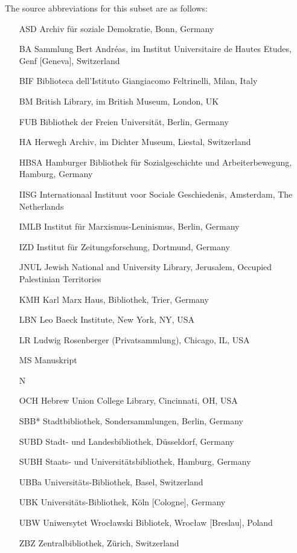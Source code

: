 The source abbreviations for this subset are as follows:
\begin{itemize}
    \item[ASD] Archiv für soziale Demokratie, Bonn, Germany
    \item[BA] Sammlung Bert Andréas, im Institut Universitaire de Hautes Etudes, Genf [Geneva], Switzerland
    \item[BIF] Biblioteca dell'Istituto Giangiacomo Feltrinelli, Milan, Italy
    \item[BM] British Library, im British Museum, London, UK
    \item[FUB] Bibliothek der Freien Universität, Berlin, Germany
    \item[HA] Herwegh Archiv, im Dichter Museum, Liestal, Switzerland
    \item[HBSA] Hamburger Bibliothek für Sozialgeschichte und Arbeiterbewegung, Hamburg, Germany
    \item[IISG] Internationaal Instituut voor Sociale Geschiedenis, Amsterdam, The Netherlands
    \item[IMLB] Institut für Marxismus-Leninismus, Berlin, Germany
    \item[IZD] Institut für Zeitungsforschung, Dortmund, Germany
    \item[JNUL] Jewish National and University Library, Jerusalem, Occupied Palestinian Territories
    \item[KMH] Karl Marx Haus, Bibliothek, Trier, Germany
    \item[LBN] Leo Baeck Institute, New York, NY, USA
    \item[LR] Ludwig Rosenberger (Privatsammlung), Chicago, IL, USA
    \item[MS] Manuskript
    \item[N] 
    \item[OCH] Hebrew Union College Library, Cincinnati, OH, USA
    \item[SBB*] Stadtbibliothek, Sondersammlungen, Berlin, Germany
    \item[SUBD] Stadt- und Landesbibliothek, Düsseldorf, Germany
    \item[SUBH] Staats- und Universitätsbibliothek, Hamburg, Germany
    \item[UBBa] Universitäts-Bibliothek, Basel, Switzerland
    \item[UBK] Universitäts-Bibliothek, Köln [Cologne], Germany
    \item[UBW] Uniwersytet Wroc\l{}awski Bibliotek, Wroc\l{}aw [Breslau], Poland
    \item[ZBZ] Zentralbibliothek, Zürich, Switzerland
\end{itemize}
